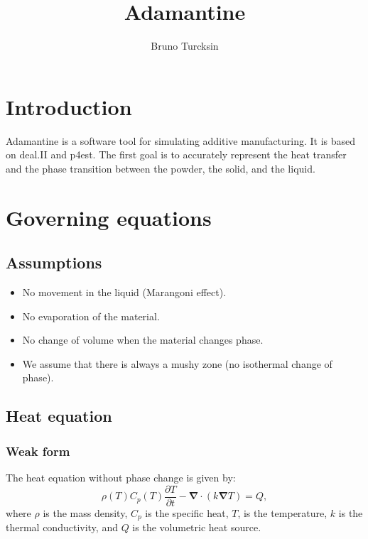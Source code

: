 \documentclass[letterpaper]{article}
\newcommand\bn{\boldsymbol{\nabla}}
\renewcommand{\(}{\left(}
\renewcommand{\)}{\right)}
\renewcommand{\[}{\left[}
\renewcommand{\]}{\right]}
\begin{document}
\title{Adamantine}
\author{Bruno Turcksin} 
\date{}
\maketitle

\section{Introduction}
Adamantine is a software tool for simulating additive manufacturing. It is based on
deal.II and p4est. The first goal is to accurately represent the heat transfer
and the phase transition between the powder, the solid, and the liquid.

\section{Governing equations}
\subsection{Assumptions}
\begin{itemize}
  \item No movement in the liquid (Marangoni effect).
  \item No evaporation of the material.
  \item No change of volume when the material changes phase.
  \item We assume that there is always a mushy zone (no isothermal change
    of phase).
\end{itemize}
\subsection{Heat equation}
\subsubsection{Weak form}
The heat equation without phase change is given by:
\begin{equation}
  \rho(T) C_p(T) \frac{\partial T}{\partial t} - \bn \cdot \(k\bn T\) = Q,
\end{equation}
where $\rho$ is the mass density, $C_p$ is the specific heat, $T$, is the
temperature, $k$ is the thermal conductivity, and $Q$ is the volumetric heat
source.
\end{document}

